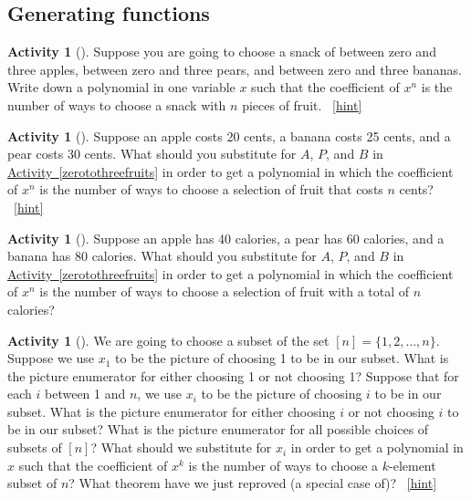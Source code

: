 \documentclass[10pt,]{book}
\theoremstyle{plain}
\theoremstyle{definition}
\theoremstyle{definition}
\theoremstyle{definition}
\newtheorem{activity}[project]{Activity}
\numberwithin{equation}{chapter}
\begin{document}
\subsection[{Generating functions}]{Generating functions}\label{subsection-32}
\begin{activity}[]\label{activity-234}
\hypertarget{p-1272}{}%
Suppose you are going to choose a snack of between zero and three apples, between zero and three pears, and between zero and three bananas. Write down a polynomial in one variable \(x\) such that the coefficient of \(x^n\) is the number of ways to choose a snack with \(n\) pieces of fruit.%
~\hfill{\tiny\hyperlink{a-241}{[hint]}\hypertarget{q-241}{}}\end{activity}
\begin{activity}[]\label{activity-235}
\hypertarget{p-1275}{}%
Suppose an apple costs 20 cents, a banana costs 25 cents, and a pear costs 30 cents. What should you substitute for \(A\), \(P\), and \(B\) in \hyperref[zerotothreefruits]{Activity~\ref{zerotothreefruits}} in order to get a polynomial in which the coefficient of \(x^n\) is the number of ways to choose a selection of fruit that costs \(n\) cents?%
~\hfill{\tiny\hyperlink{a-242}{[hint]}\hypertarget{q-242}{}}\end{activity}
\begin{activity}[]\label{activity-236}
\hypertarget{p-1278}{}%
Suppose an apple has 40 calories, a pear has 60 calories, and a banana has 80 calories. What should you substitute for \(A\), \(P\), and \(B\) in \hyperref[zerotothreefruits]{Activity~\ref{zerotothreefruits}} in order to get a polynomial in which the coefficient of \(x^n\) is the number of ways to choose a selection of fruit with a total of \(n\) calories?%
\end{activity}
\begin{activity}[]\label{reprovingbinomialtheorem}
\hypertarget{p-1280}{}%
We are going to choose a subset of the set \([n]=\{1,2,\ldots, n\}\). Suppose we use \(x_1\) to be the picture of choosing 1 to be in our subset. What is the picture enumerator for either choosing 1 or not choosing 1? Suppose that for each \(i\) between 1 and \(n\), we use \(x_i\) to be the picture of choosing \(i\) to be in our subset. What is the picture enumerator for either choosing \(i\) or not choosing \(i\) to be in our subset? What is the picture enumerator for all possible choices of subsets of \([n]\)? What should we substitute for \(x_i\) in order to get a polynomial in \(x\) such that the coefficient of \(x^k\) is the number of ways to choose a \(k\)-element subset of \(n\)? What theorem have we just reproved (a special case of)?%
~\hfill{\tiny\hyperlink{a-244}{[hint]}\hypertarget{q-244}{}}\end{activity}
\end{document}
